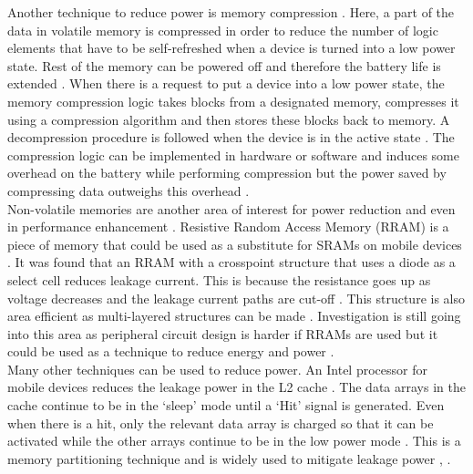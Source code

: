 \documentclass[journal]{IEEEtran}
\begin{document}
Another technique to reduce power is memory compression \cite{MemComp}. Here, a part of the data in volatile memory is compressed in order to reduce the number of logic elements that have to be self-refreshed when a device is turned into a low power state. Rest of the memory can be powered off and therefore the battery life is extended \cite{MemComp}. When there is a request to put a device into a low power state, the memory compression logic takes blocks from a designated memory, compresses it using a compression algorithm and then stores these blocks back to memory. A decompression procedure is followed when the device is in the active state \cite{MemComp}. The compression logic can be implemented in hardware or software and induces some overhead on the battery while performing compression but the power saved by compressing data outweighs this overhead \cite{MemComp}.\\

Non-volatile memories are another area of interest for power reduction and even in performance enhancement \cite{NonVolatile}. Resistive Random Access Memory (RRAM) is a piece of memory that could be used as a substitute for SRAMs on mobile devices \cite{NonVolatile}. It was found that an RRAM with a crosspoint structure that uses a diode as a select cell reduces leakage current. This is because the resistance goes up as voltage decreases and the leakage current paths are cut-off \cite{NonVolatile}. This structure is also area efficient as multi-layered structures can be made \cite{NonVolatile}. Investigation is still going into this area as peripheral circuit design is harder if RRAMs are used but it could be used as a technique to reduce energy and power \cite{NonVolatile}.\\

Many other techniques can be used to reduce power. An Intel processor for mobile devices reduces the leakage power in the L2 cache \cite{Intel}. The data arrays in the cache continue to be in the ‘sleep’ mode until a ‘Hit’ signal is generated. Even when there is a hit, only the relevant data array is charged so that it can be activated while the other arrays continue to be in the low power mode \cite{Intel}. This is a memory partitioning technique and is widely used to mitigate leakage power \cite{LowPower2005}, \cite{Intel}.
\end{document}
